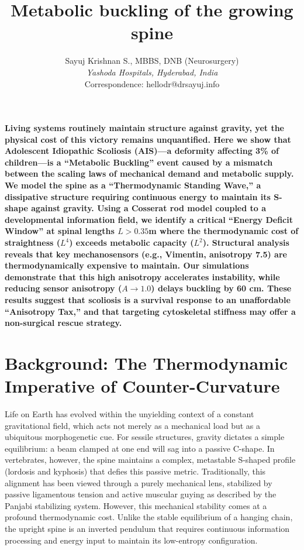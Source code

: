 \documentclass[11pt]{article}
\title{Metabolic buckling of the growing spine}
\author{Sayuj Krishnan S., MBBS, DNB (Neurosurgery) \\
\textit{Yashoda Hospitals, Hyderabad, India} \\
Correspondence: hellodr@drsayuj.info}
\date{}
\begin{document}
\maketitle

\textbf{Living systems routinely maintain structure against gravity, yet the physical cost of this victory remains unquantified. Here we show that Adolescent Idiopathic Scoliosis (AIS)—a deformity affecting 3\% of children—is a ``Metabolic Buckling'' event caused by a mismatch between the scaling laws of mechanical demand and metabolic supply. We model the spine as a ``Thermodynamic Standing Wave,'' a dissipative structure requiring continuous energy to maintain its S-shape against gravity. Using a Cosserat rod model coupled to a developmental information field, we identify a critical ``Energy Deficit Window'' at spinal lengths $L > 0.35$m where the thermodynamic cost of straightness ($L^4$) exceeds metabolic capacity ($L^2$). Structural analysis reveals that key mechanosensors (e.g., Vimentin, anisotropy 7.5) are thermodynamically expensive to maintain. Our simulations demonstrate that this high anisotropy accelerates instability, while reducing sensor anisotropy ($A \to 1.0$) delays buckling by 60 cm. These results suggest that scoliosis is a survival response to an unaffordable ``Anisotropy Tax,'' and that targeting cytoskeletal stiffness may offer a non-surgical rescue strategy.}

\vspace{1em}

\section*{Background: The Thermodynamic Imperative of Counter-Curvature}

Life on Earth has evolved within the unyielding context of a constant gravitational field, which acts not merely as a mechanical load but as a ubiquitous morphogenetic cue\cite{thompson1917growth, ingber2008tensegrity}. For sessile structures, gravity dictates a simple equilibrium: a beam clamped at one end will sag into a passive C-shape. In vertebrates, however, the spine maintains a complex, metastable S-shaped profile (lordosis and kyphosis) that defies this passive metric\cite{latimer2005upright}. Traditionally, this alignment has been viewed through a purely mechanical lens, stabilized by passive ligamentous tension and active muscular guying as described by the Panjabi stabilizing system\cite{panjabi1992stabilizing}. However, this mechanical stability comes at a profound thermodynamic cost. Unlike the stable equilibrium of a hanging chain, the upright spine is an inverted pendulum that requires continuous information processing and energy input to maintain its low-entropy configuration\cite{kuo2005optimal, schneider1994life}.
\end{document}
